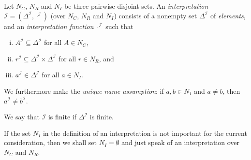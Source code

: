 \begin{Definition}[Interpretation]
  \label{def:interpretation}
  Let $N_C$, $N_R$ and $N_I$ be three pairwise disjoint sets.  An \emph{interpretation}
  $\mathcal{I} = (\Delta^{\mathcal{I}}, \cdot^{\mathcal{I}})$ (over $N_C$, $N_R$ and
  $N_I$) consists of a nonempty set $\Delta^{\mathcal{I}}$ of \emph{elements}, and an
  \emph{interpretation function} $\cdot^{\mathcal{I}}$ such that
  \begin{enumerate}[i. ]
  \item $A^{\mathcal{I}} \subseteq \Delta^{\mathcal{I}}$ for all $A \in N_C$,
  \item $r^{\mathcal{I}} \subseteq \Delta^{\mathcal{I}} \times \Delta^{\mathcal{I}}$ for
    all $r \in N_R$, and
  \item $a^{\mathcal{I}} \in \Delta^{\mathcal{I}}$ for all $a \in N_I$.
  \end{enumerate}
  We furthermore make the \emph{unique name assumption}: if $a, b \in N_I$ and $a \neq b$,
  then $a^{\mathcal{I}} \neq b^{\mathcal{I}}$.

  We say that $\mathcal{I}$ is finite if $\Delta^{\mathcal{I}}$ is finite.
\end{Definition}

If the set $N_I$ in the definition of an interpretation is not important for the current
consideration, then we shall set $N_I = \emptyset$ and just speak of an interpretation
over $N_C$ and $N_R$.

